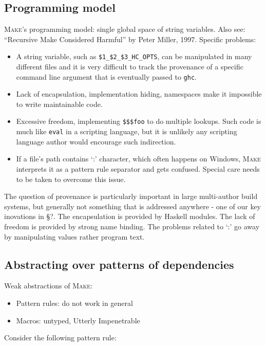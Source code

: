 \subsection{Programming model}

\textsc{Make}'s programming model: single global space of string variables. Also
see: ``Recursive Make Considered Harmful'' by Peter Miller, 1997. Specific problems:
\begin{itemize}
  \item A string variable, such as \texttt{\$1\_\$2\_\$3\_HC\_OPTS}, can be
  manipulated in many different files and it is very difficult to track the
  provenance of a specific command line argument that is eventually passed to
  \texttt{ghc}.
  \item Lack of encapsulation, implementation hiding, namespaces make it
  impossible to write maintainable code.
  \item Excessive freedom, implementing \texttt{\$\$\$foo} to do multiple lookups. Such code is much like \texttt{eval} in a scripting language, but it is unlikely any scripting language author would encourage such indirection.
  \item If a file's path contains `:' character, which often happens on Windows,
  \textsc{Make} interprets it as a pattern rule separator and gets confused.
  Special care needs to be taken to overcome this issue.
\end{itemize}

The question of provenance is particularly important in large multi-author build systems, but generally not something that is addressed anywhere - one of our key inovations in \S?. The encapsulation is provided by Haskell modules. The lack of freedom is provided by strong name binding. The problems related to `:' go away by manipulating values rather program text.

\subsection{Abstracting over patterns of dependencies}

Weak abstractions of \textsc{Make}:
\begin{itemize}
  \item Pattern rules: do not work in general
  \item Macros: untyped, Utterly Impenetrable 
\end{itemize}

\noindent Consider the following pattern rule:

